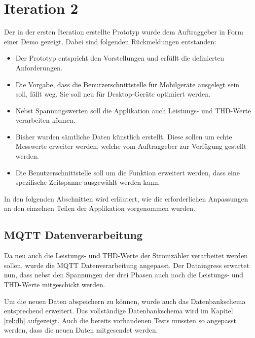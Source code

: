 \section{Iteration 2}
\label{i2}
Der in der ersten Iteration erstellte Prototyp wurde dem Auftraggeber in Form einer Demo gezeigt.
Dabei sind folgenden Rückmeldungen entstanden:

\begin{itemize}
    \item Der Prototyp entspricht den Vorstellungen und erfüllt die definierten Anforderungen.
    \item Die Vorgabe, dass die Benutzerschnittstelle für Mobilgeräte ausgelegt sein soll, fällt weg.
          Sie soll neu für Desktop-Geräte optimiert werden.
    \item Nebst Spannungswerten soll die Applikation auch Leistungs- und \ac{THD}-Werte verarbeiten können.
    \item Bisher wurden sämtliche Daten künstlich erstellt.
          Diese sollen um echte Messwerte erweiter werden, welche vom Auftraggeber zur Verfügung gestellt werden.
    \item Die Benutzerschnittstelle soll um die Funktion erweitert werden,
          dass eine spezifische Zeitspanne ausgewählt werden kann.
\end{itemize}
In den folgenden Abschnitten wird erläutert,
wie die erforderlichen Anpassungen an den einzelnen Teilen der Applikation vorgenommen wurden.

\subsection{\ac{MQTT} Datenverarbeitung}
\label{i2:mqtt}
Da neu auch die Leistungs- und \ac{THD}-Werte der Stromzähler verarbeitet werden sollen, wurde
die \ac{MQTT} Datenverarbeitung angepasst. Der Dataingress erwartet nun, dass nebst
den Spannungen der drei Phasen auch noch die Leistungs- und \ac{THD}-Werte mitgeschickt werden.

Um die neuen Daten abspeichern zu können, wurde auch das Datenbankschema entsprechend erweitert.
Das vollständige Datenbankschema wird im Kapitel \ref{rel:db} aufgezeigt.
Auch die bereits vorhandenen Tests mussten so angepasst werden, dass die neuen Daten
mitgesendet werden.

